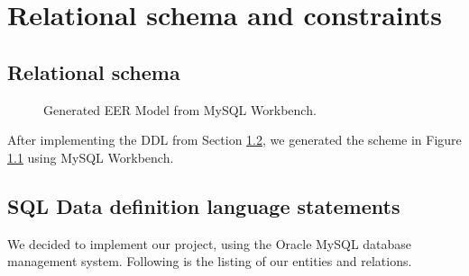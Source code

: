 %
%
%
%

\chapter{Relational schema and constraints}

\section{Relational schema}

\begin{figure}[h!]
	\centering
	\caption{Generated EER Model from MySQL Workbench.\label{fig:ddl-scheme}}
\end{figure}
After implementing the DDL from Section \ref{sec:ddl}, we generated the scheme in Figure \ref{fig:ddl-scheme} using MySQL Workbench.

\newpage
\section{SQL Data definition language statements}
\label{sec:ddl}

We decided to implement our project, using the Oracle MySQL database management system. Following is the listing of our entities and relations.

\begin{center}
	
\end{center}

\begin{center}
	
\end{center}


